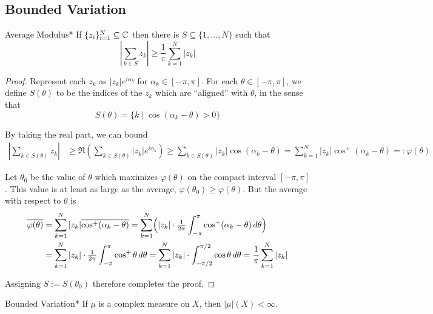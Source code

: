 \subsection{Bounded Variation}

\begin{lemma}{Average Modulus}*
    If \(\{z_i\}_{i=1}^N \subseteq \mathbb{C}\) then there is \(S \subseteq \{1, \dots, N\}\) such that 
    \[
        \left| \sum_{k \in S} z_k \right| \geq \frac{1}{\pi} \sum_{k=1}^N |z_k|
    \]
\end{lemma}

\begin{proof}
    Represent each \(z_k\) as \(|z_k| e^{i\alpha_k}\) for \(\alpha_k \in [-\pi, \pi]\). For each \(\theta \in [-\pi, \pi]\), we define \(S(\theta)\) to be the indices of the \(z_k\) which are “aligned” with \(\theta\), in the sense that 
    \[
        S(\theta) = \{k \mid \cos(\alpha_k - \theta) > 0\}
    \]

    By taking the real part, we can bound
    \begin{align*}
        \left| \sum_{k \in S(\theta)} z_k \right| 
        &\geq \Re \left( \sum_{k \in S(\theta)} |z_k| e^{i \alpha_k} \right)
        \geq \sum_{k \in S(\theta)} |z_k| \cos(\alpha_k - \theta)
        = \sum_{k=1}^N |z_k| \cos^+(\alpha_k - \theta)
        =: \varphi(\theta)
    \end{align*}

    Let \(\theta_0\) be the value of \(\theta\) which maximizes \(\varphi(\theta)\) on the compact interval \([- \pi, \pi]\). This value is at least as large as the average, \(\varphi(\theta_0) \geq \overline{\varphi(\theta)}\). But the average with respect to \(\theta\) is 
    \begin{align*}
        \overline{\varphi(\theta)} 
        &= \sum_{k=1}^N |z_k| \overline{\cos^+(\alpha_k - \theta)}
        = \sum_{k=1}^N \Bigl( |z_k| \cdot \tfrac{1}{2\pi} \int_{-\pi}^\pi \cos^+(\alpha_k - \theta) \, d\theta \Bigr) \\
        &= \sum_{k=1}^N |z_k| \cdot \tfrac{1}{2\pi} \int_{-\pi}^\pi \cos^+ \theta \, d\theta
        = \sum_{k=1}^N |z_k| \cdot \int_{-\pi/2}^{\pi/2} \cos \theta \, d\theta
        = \frac{1}{\pi} \sum_{k=1}^N |z_k| 
    \end{align*}

    Assigning \(S := S(\theta_0)\) therefore completes the proof. 
\end{proof}

\begin{theorem}{Bounded Variation}*
    If \(\mu\) is a complex measure on \(X\), then \(|\mu|(X) < \infty\).
\end{theorem}

